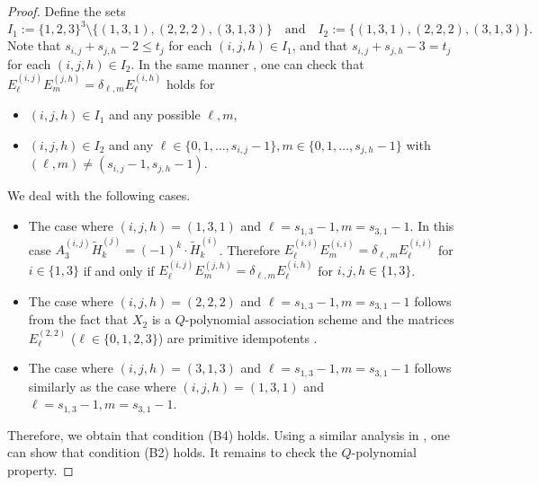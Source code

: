 \documentclass[11pt]{article}
\theoremstyle{definition}
\theoremstyle{remark}
\begin{document}
\begin{proof}
Define the sets
\begin{equation*}
I_1:=\{1,2,3\}^3\setminus \{(1,3,1),(2,2,2),(3,1,3)\} \quad \text{and}\quad	I_2:=\{(1,3,1),(2,2,2),(3,1,3)\}.
\end{equation*}
Note that $s_{i,j}+s_{j,h}-2\leq t_j$ for each $(i,j,h)\in I_1$, and that $s_{i,j}+s_{j,h}-3= t_j$ for each $(i,j,h)\in I_2$. In the same manner \cite[Theorem 5.10]{Suda22}, one can check that  $  {E}_\ell^{(i,j)}  {E}_m^{(j,h)}=\delta_{\ell,m}  {E}_\ell^{(i,h)}$ holds for
\begin{itemize}
\item $(i,j,h)\in I_1$ and any possible $\ell,m$, 
\item $(i,j,h)\in I_2$ and any $\ell\in \{0,1,\ldots,s_{i,j}-1\},m\in\{0,1,\ldots,s_{j,h}-1\}$ with $(\ell,m)\neq (s_{i,j}-1,s_{j,h}-1)$. 
\end{itemize}
We deal with the following cases. 
\begin{itemize} 
\item The case where $(i,j,h)=(1,3,1)$ and $\ell=s_{1,3}-1,m=s_{3,1}-1$. In this case $A_3^{(i,j)}\widetilde{H}_k^{(j)}=(-1)^k\cdot\widetilde{H}_k^{(i)}$. 
Therefore $E_\ell^{(i,i)}E_m^{(i,i)}=\delta_{\ell,m}E_\ell^{(i,i)}$ for $i\in\{1,3\}$ if and only if $E_\ell^{(i,j)}E_m^{(j,h)}=\delta_{\ell,m}E_\ell^{(i,h)}$ for $i,j,h\in\{1,3\}$.  
\item The case where $(i,j,h)=(2,2,2)$ and $\ell=s_{1,3}-1,m=s_{3,1}-1$ follows from the fact that $X_2$ is a $Q$-polynomial association scheme and the matrices $E_\ell^{(2,2)}$ ($\ell\in\{0,1,2,3\}$) are primitive idempotents \cite{BB09a}.  
\item The case where $(i,j,h)=(3,1,3)$ and $\ell=s_{1,3}-1,m=s_{3,1}-1$ follows similarly as the case where $(i,j,h)=(1,3,1)$ and $\ell=s_{1,3}-1,m=s_{3,1}-1$. 
\end{itemize}
Therefore, we obtain that condition (B4) holds. Using a similar analysis in \cite{Suda22}, one can show that condition (B2) holds. It remains to check the $Q$-polynomial property.


\end{proof}
\end{document}
